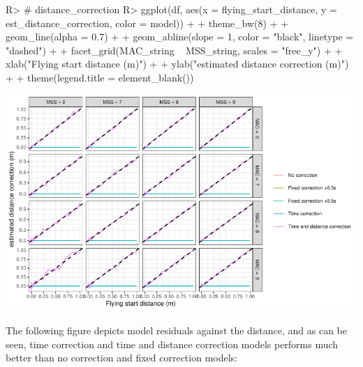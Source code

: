 \documentclass[
]{jss}
\begin{document}
\begin{CodeChunk}
\begin{CodeInput}
R> # distance_correction
R> ggplot(df, aes(x = flying_start_distance, y = est_distance_correction, color = model)) +
+   theme_bw(8) +
+   geom_line(alpha = 0.7) +
+   geom_abline(slope = 1, color = "black", linetype = "dashed") +
+   facet_grid(MAC_string ~ MSS_string, scales = "free_y") +
+   xlab("Flying start distance (m)") +
+   ylab("estimated distance correction (m)") +
+   theme(legend.title = element_blank())
\end{CodeInput}


\begin{center}\includegraphics[width=1\linewidth]{paper_files/figure-latex/unnamed-chunk-39-1} \end{center}

\end{CodeChunk}

The following figure depicts model residuals against the distance, and as can be seen, time correction and time and distance correction models performs much better than no correction and fixed correction models:
\end{document}
